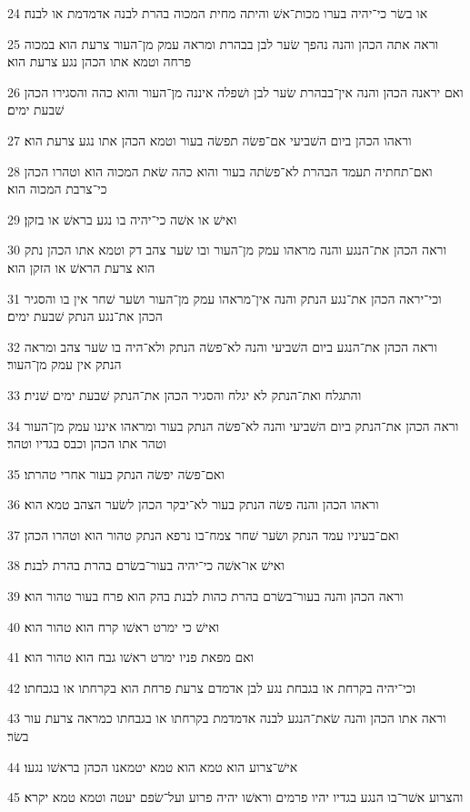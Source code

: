 \par 24 או בשׂר כי־יהיה בערו מכות־אשׁ והיתה מחית המכוה בהרת לבנה אדמדמת או לבנה׃
\par 25 וראה אתה הכהן והנה נהפך שׂער לבן בבהרת ומראה עמק מן־העור צרעת הוא במכוה פרחה וטמא אתו הכהן נגע צרעת הוא׃
\par 26 ואם יראנה הכהן והנה אין־בבהרת שׂער לבן ושׁפלה איננה מן־העור והוא כהה והסגירו הכהן שׁבעת ימים׃
\par 27 וראהו הכהן ביום השׁביעי אם־פשׂה תפשׂה בעור וטמא הכהן אתו נגע צרעת הוא׃
\par 28 ואם־תחתיה תעמד הבהרת לא־פשׂתה בעור והוא כהה שׂאת המכוה הוא וטהרו הכהן כי־צרבת המכוה הוא׃
\par 29 ואישׁ או אשׁה כי־יהיה בו נגע בראשׁ או בזקן׃
\par 30 וראה הכהן את־הנגע והנה מראהו עמק מן־העור ובו שׂער צהב דק וטמא אתו הכהן נתק הוא צרעת הראשׁ או הזקן הוא׃
\par 31 וכי־יראה הכהן את־נגע הנתק והנה אין־מראהו עמק מן־העור ושׂער שׁחר אין בו והסגיר הכהן את־נגע הנתק שׁבעת ימים׃
\par 32 וראה הכהן את־הנגע ביום השׁביעי והנה לא־פשׂה הנתק ולא־היה בו שׂער צהב ומראה הנתק אין עמק מן־העור׃
\par 33 והתגלח ואת־הנתק לא יגלח והסגיר הכהן את־הנתק שׁבעת ימים שׁנית׃
\par 34 וראה הכהן את־הנתק ביום השׁביעי והנה לא־פשׂה הנתק בעור ומראהו איננו עמק מן־העור וטהר אתו הכהן וכבס בגדיו וטהר׃
\par 35 ואם־פשׂה יפשׂה הנתק בעור אחרי טהרתו׃
\par 36 וראהו הכהן והנה פשׂה הנתק בעור לא־יבקר הכהן לשׂער הצהב טמא הוא׃
\par 37 ואם־בעיניו עמד הנתק ושׂער שׁחר צמח־בו נרפא הנתק טהור הוא וטהרו הכהן׃
\par 38 ואישׁ או־אשׁה כי־יהיה בעור־בשׂרם בהרת בהרת לבנת׃
\par 39 וראה הכהן והנה בעור־בשׂרם בהרת כהות לבנת בהק הוא פרח בעור טהור הוא׃
\par 40 ואישׁ כי ימרט ראשׁו קרח הוא טהור הוא׃
\par 41 ואם מפאת פניו ימרט ראשׁו גבח הוא טהור הוא׃
\par 42 וכי־יהיה בקרחת או בגבחת נגע לבן אדמדם צרעת פרחת הוא בקרחתו או בגבחתו׃
\par 43 וראה אתו הכהן והנה שׂאת־הנגע לבנה אדמדמת בקרחתו או בגבחתו כמראה צרעת עור בשׂר׃
\par 44 אישׁ־צרוע הוא טמא הוא טמא יטמאנו הכהן בראשׁו נגעו׃
\par 45 והצרוע אשׁר־בו הנגע בגדיו יהיו פרמים וראשׁו יהיה פרוע ועל־שׂפם יעטה וטמא טמא יקרא׃
